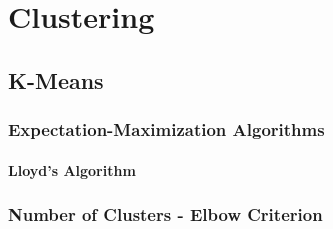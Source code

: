 \section{Clustering}

\subsection{K-Means}

\subsubsection{Expectation-Maximization Algorithms}
\paragraph{Lloyd's Algorithm}

\subsubsection{Number of Clusters - Elbow Criterion}